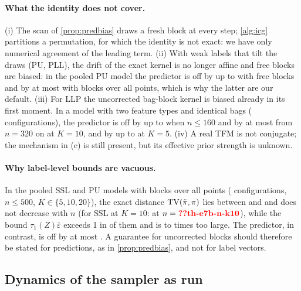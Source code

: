\paragraph{What the identity does not cover.} (i) The scan of \cref{prop:predbias} draws a fresh block at every step;
\cref{alg:icg} partitions a permutation, for which the identity is not exact: we have only numerical agreement of the
leading term. (ii) With weak
labels that tilt the draws (PU, PLL), the drift of the exact kernel is no longer affine and free blocks are biased: in
the pooled PU model the predictor is off by up to  with free blocks and by at most
 with blocks over all points, which is why the latter are our default. (iii) For LLP the uncorrected bag-block kernel is biased already in its first moment. In a model with two
feature types and identical bags ( configurations), the predictor is off by up to 
when $n\le160$ and by at most  from $n=320$ on at $K=10$, and by up to  at
$K=5$. (iv) A real TFM is not conjugate; the
mechanism in (c) is still present, but its effective prior strength is unknown.

\paragraph{Why label-level bounds are vacuous.} In the pooled SSL and PU models with blocks over all points
( configurations, $n\le500$, $K\in\{5,10,20\}$), the exact distance $\mathrm{TV}(\tilde\pi,\pi)$ lies between
 and  and does not decrease with $n$ (for SSL at $K=10$:  at
$n=\val{th-e7b-n-k10}$), while the bound $\tau_1(Z)\bar\varepsilon$ exceeds 1 in  of them and is
 to  times too large. The predictor, in contrast, is off by at most
. A guarantee for uncorrected blocks should therefore be stated for predictions, as in
\cref{prop:predbias}, and not for label vectors.

\subsection{Dynamics of the sampler as run}\label{app:dynamics}
